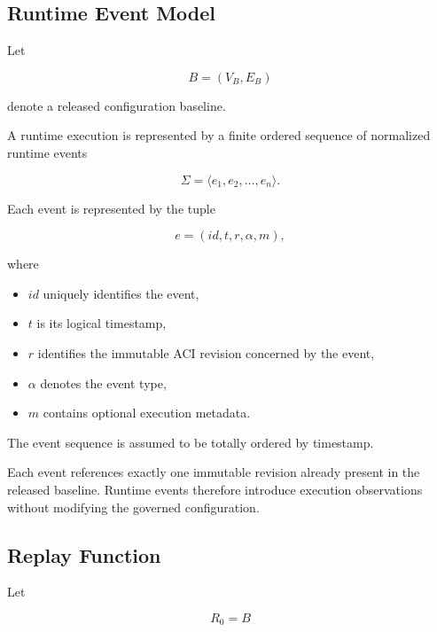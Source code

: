 \documentclass[10pt]{article}
\begin{document}
	\subsection{Runtime Event Model}
	\label{appendix:runtime_event_model}
	
	Let
	
	\[
	B=(V_B,E_B)
	\]
	
	denote a released configuration baseline.
	
	A runtime execution is represented by a finite ordered sequence of normalized
	runtime events
	
	\begin{equation}
		\Sigma
		=
		\langle
		e_1,e_2,\ldots,e_n
		\rangle.
	\end{equation}
	
	Each event is represented by the tuple
	
	\begin{equation}
		e
		=
		(
		id,
		t,
		r,
		\alpha,
		m
		),
	\end{equation}
	
	where
	
	\begin{itemize}
		\item $id$ uniquely identifies the event,
		\item $t$ is its logical timestamp,
		\item $r$ identifies the immutable ACI revision concerned by the event,
		\item $\alpha$ denotes the event type,
		\item $m$ contains optional execution metadata.
	\end{itemize}
	
	The event sequence is assumed to be totally ordered by timestamp.
	
	Each event references exactly one immutable revision already present in the
	released baseline. Runtime events therefore introduce execution observations
	without modifying the governed configuration.
	
	\subsection{Replay Function}
	\label{appendix:replay_function}
	
	Let
	
	\[
	R_0=B
	\]
	
\end{document}
